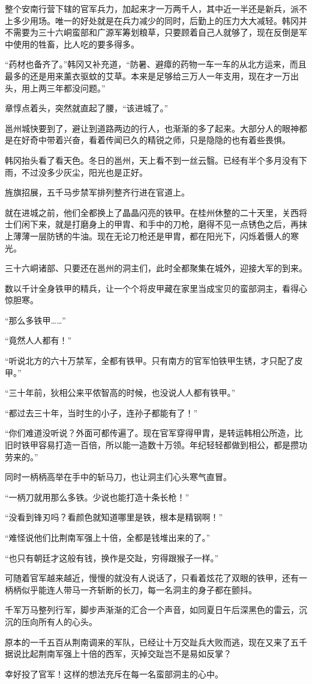 整个安南行营下辖的官军兵力，加起来才一万两千人，其中近一半还是新兵，派不上多少用场。唯一的好处就是在兵力减少的同时，后勤上的压力大大减轻。韩冈并不需要为三十六峒蛮部和广源军筹划粮草，只要顾着自己人就够了，现在反倒是军中使用的牲畜，比人吃的要多得多。

“药材也备齐了。”韩冈又补充道，“防暑、避瘴的药物一车一车的从北方运来，而且最多的还是用来薰衣驱蚊的艾草。本来是足够给三万人一年支用，现在才一万出头，用上两三年都没问题。”

章惇点着头，突然就直起了腰，“该进城了。”

邕州城快要到了，避让到道路两边的行人，也渐渐的多了起来。大部分人的眼神都是在好奇中带着兴奋，看着传闻已久的精锐之师，只是隐隐的也有着些畏惧。

韩冈抬头看了看天色。冬日的邕州，天上看不到一丝云翳。已经有半个多月没有下雨，不过没多少灰尘，阳光也是正好。

旌旗招展，五千马步禁军排列整齐行进在官道上。

就在进城之前，他们全都换上了晶晶闪亮的铁甲。在桂州休整的二十天里，关西将士们闲下来，就是打磨身上的甲胄、和手中的刀枪，磨得不见一点锈色之后，再抹上薄薄一层防锈的牛油。现在无论刀枪还是甲胄，都在阳光下，闪烁着慑人的寒光。

三十六峒诸部、只要还在邕州的洞主们，此时全都聚集在城外，迎接大军的到来。

数以千计全身铁甲的精兵，让一个个将皮甲藏在家里当成宝贝的蛮部洞主，看得心惊胆寒。

“那么多铁甲……”

“竟然人人都有！”

“听说北方的六十万禁军，全都有铁甲。只有南方的官军怕铁甲生锈，才只配了皮甲。”

“三十年前，狄相公来平侬智高的时候，也没说人人都有铁甲。”

“都过去三十年，当时生的小子，连孙子都能有了！”

“你们难道没听说？外面可都传遍了。现在官军穿得甲胄，是转运韩相公所造，比旧时铁甲容易打造一百倍，所以能一造数十万领。年纪轻轻都做到相公，都是攒功劳来的。”

同时一柄柄高举在手中的斩马刀，也让洞主们心头寒气直冒。

“一柄刀就用那么多铁。少说也能打造十条长枪！”

“没看到锋刃吗？看颜色就知道哪里是铁，根本是精钢啊！”

“难怪说他们比荆南军强上十倍，全都是钱堆出来的了。”

“也只有朝廷才这般有钱，换作是交趾，穷得跟猴子一样。”

可随着官军越来越近，慢慢的就没有人说话了，只看着炫花了双眼的铁甲，还有一柄柄似乎能连人带马一齐斩断的长刀，每一名洞主的身子都在颤抖。

千军万马整列行军，脚步声渐渐的汇合一个声音，如同夏日午后深黑色的雷云，沉沉的压向所有人的心头。

原本的一千五百从荆南调来的军队，已经让十万交趾兵大败而逃，现在又来了五千据说比起荆南军强上十倍的西军，灭掉交趾岂不是易如反掌？

幸好投了官军！这样的想法充斥在每一名蛮部洞主的心中。

